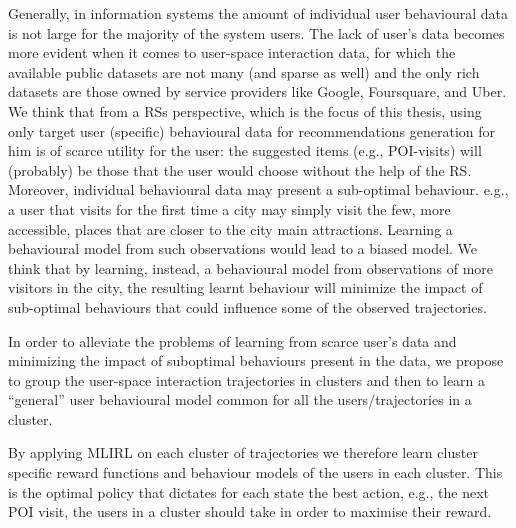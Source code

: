 Generally, in information systems 
the amount of individual user behavioural data is not large for the majority of the system users. The lack of user's data becomes more evident when it comes to user-space interaction data, for which the available public datasets are not many (and sparse as well) and the only rich datasets are those owned by service providers like Google, Foursquare, and Uber.
We think that from a RSs perspective, which is the focus of this thesis, using only target user (specific) behavioural data
for recommendations generation for him is of scarce utility for the user: 
the suggested items (e.g., POI-visits) will (probably) be those that the user would choose without the help of the RS. 
Moreover, individual behavioural data may present a sub-optimal behaviour. e.g., a user that visits for the first time a city may simply visit the few, more accessible, places that are closer to the city main attractions. Learning a behavioural model from such observations would lead to a biased model. We think that by learning, instead, a behavioural model from observations of more visitors 
in the city, the resulting learnt behaviour will minimize the impact of sub-optimal behaviours that could influence some of the observed trajectories.

In order to alleviate the problems of learning from scarce user's data and minimizing the impact of suboptimal behaviours present in the data, we propose to group the user-space interaction trajectories in clusters and then to learn a ``general'' user behavioural model common for all the users/trajectories in a cluster.

By applying MLIRL on each cluster of trajectories we therefore learn cluster specific reward functions and behaviour models of the users in each cluster. This is the optimal policy that dictates for each state the best action, e.g., the next POI visit, the users in a cluster should take in order to maximise their reward.

